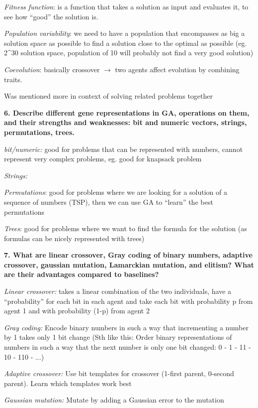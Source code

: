 \textit{Fitness function}: is a function that takes a solution as
input and evaluates it, to see how ``good'' the solution is.

\textit{Population variability}: we need to have a population that
encompasses as big a solution space as possible to find a solution close
to the optimal as possible (eg. 2\^{}30 solution space, population of 10
will probably not find a very good solution)

\textit{Coevolution}: basically crossover $\rightarrow$ two agents
affect evolution by combining traits.

Was mentioned more in context of solving related problems together

\textbf{6. Describe different gene representations in GA, operations on
them, and their strengths and weaknesses: bit and numeric vectors,
strings, permutations, trees.}

\textit{bit/numeric:} good for problems that can be represented with
numbers, cannot represent very complex problems, eg. good for knapsack
problem

\textit{Strings:}

\textit{Permutations}: good for problems where we are looking for a
solution of a sequence of numbers (TSP), then we can use GA to ``learn''
the best permutations

\textit{Trees}: good for problems where we want to find the formula
for the solution (as formulas can be nicely represented with trees)

\textbf{7. What are linear crossover, Gray coding of binary numbers,
adaptive crossover, gaussian mutation, Lamarckian mutation, and elitism?
What are their advantages compared to baselines?}

\textit{Linear crossover:} takes a linear combination of the two
individuals, have a ``probability'' for each bit in each agent and take
each bit with probability p from agent 1 and with probability (1-p) from
agent 2

\textit{Gray coding:} Encode binary numbers in such a way that
incrementing a number by 1 takes only 1 bit change (Sth like this: Order
binary representations of numbers in such a way that the next number is
only one bit changed: 0 - 1 - 11 - 10 - 110 - ...)

\textit{Adaptive crossover:} Use bit templates for crossover (1-first
parent, 0-second parent). Learn which templates work best

\textit{Gaussian mutation:} Mutate by adding a Gaussian error to the
mutation

